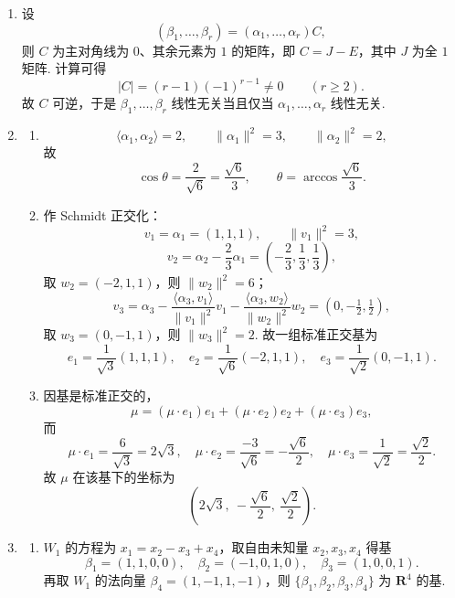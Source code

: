\begin{enumerate}
    \item 设
    \[
        (\beta_1,\ldots,\beta_r)
        =(\alpha_1,\ldots,\alpha_r)C,
    \]
    则 $C$ 为主对角线为 $0$、其余元素为 $1$ 的矩阵，即 $C=J-E$，其中 $J$ 为全 $1$ 矩阵. 计算可得
    \[
        |C|=(r-1)(-1)^{r-1}\neq 0\qquad(r\geqslant 2).
    \]
    故 $C$ 可逆，于是 $\beta_1,\ldots,\beta_r$ 线性无关当且仅当 $\alpha_1,\ldots,\alpha_r$ 线性无关.

    \item
    \begin{enumerate}
        \item
        \[
            \langle\alpha_1,\alpha_2\rangle=2,\qquad
            \|\alpha_1\|^2=3,\qquad
            \|\alpha_2\|^2=2,
        \]
        故
        \[
            \cos\theta=\frac{2}{\sqrt6}=\frac{\sqrt6}{3},
            \qquad \theta=\arccos\frac{\sqrt6}{3}.
        \]

        \item 作 Schmidt 正交化：
        \[
            v_1=\alpha_1=(1,1,1),\qquad \|v_1\|^2=3,
        \]
        \[
            v_2=\alpha_2-\frac23\alpha_1
            =\left(-\frac23,\frac13,\frac13\right),
        \]
        取 $w_2=(-2,1,1)$，则 $\|w_2\|^2=6$；
        \[
            v_3=\alpha_3-\frac{\langle\alpha_3,v_1\rangle}{\|v_1\|^2}v_1
            -\frac{\langle\alpha_3,w_2\rangle}{\|w_2\|^2}w_2
            =(0,-\tfrac12,\tfrac12),
        \]
        取 $w_3=(0,-1,1)$，则 $\|w_3\|^2=2$. 故一组标准正交基为
        \[
            e_1=\frac{1}{\sqrt3}(1,1,1),\quad
            e_2=\frac{1}{\sqrt6}(-2,1,1),\quad
            e_3=\frac{1}{\sqrt2}(0,-1,1).
        \]

        \item 因基是标准正交的，
        \[
            \mu=(\mu\cdot e_1)e_1+(\mu\cdot e_2)e_2+(\mu\cdot e_3)e_3,
        \]
        而
        \[
            \mu\cdot e_1=\frac{6}{\sqrt3}=2\sqrt3,\quad
            \mu\cdot e_2=\frac{-3}{\sqrt6}=-\frac{\sqrt6}{2},\quad
            \mu\cdot e_3=\frac{1}{\sqrt2}=\frac{\sqrt2}{2}.
        \]
        故 $\mu$ 在该基下的坐标为
        \[
            \left(2\sqrt3,\ -\frac{\sqrt6}{2},\ \frac{\sqrt2}{2}\right).
        \]
    \end{enumerate}

    \item
    \begin{enumerate}
        \item $W_1$ 的方程为 $x_1=x_2-x_3+x_4$，取自由未知量 $x_2,x_3,x_4$ 得基
        \[
            \beta_1=(1,1,0,0),\quad
            \beta_2=(-1,0,1,0),\quad
            \beta_3=(1,0,0,1).
        \]
        再取 $W_1$ 的法向量 $\beta_4=(1,-1,1,-1)$，则 $\{\beta_1,\beta_2,\beta_3,\beta_4\}$ 为 $\mathbf{R}^4$ 的基.


\end{enumerate}
\end{enumerate}

